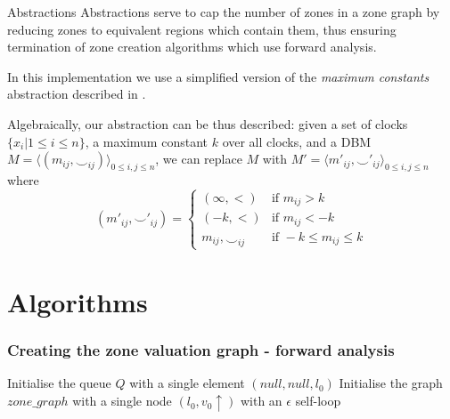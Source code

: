 \documentclass{beamer}
\begin{document}
\begin{frame}{Abstractions}
Abstractions serve to cap the number of zones in a
zone graph by reducing zones to equivalent regions which contain them,
thus ensuring termination of zone creation algorithms which use
forward analysis.

In this implementation we use a simplified version of the
\emph{maximum constants} abstraction described in
\cite{Behrmann03staticguard}.

Algebraically, our abstraction can be thus described: given a set of
clocks $\{x_i | 1 \leq i \leq n \}$, a maximum constant $k$ over all
clocks, and a DBM $M = \langle (m_{ij}, \smile _{ij})\rangle _{0 \leq
  i,j \leq n} $, we can replace $M$ with $M' = \langle m'_{ij}, \smile
'_{ij}\rangle _{0 \leq i,j \leq n} $ where
\begin{displaymath}
  (m'_{ij}, \smile'_{ij}) =
    \begin{cases}
      (\infty, <)  & \mbox{if } m_{ij} > k \\
      (-k, <)  & \mbox{if } m_{ij} < -k \\
      m_{ij}, \smile _{ij} & \mbox{if } -k \leq m_{ij} \leq k
    \end{cases}
\end{displaymath}

\end{frame}

\section{Algorithms}

\begin{frame}[fragile, shrink=20]
  \frametitle{Creating the zone valuation graph - forward analysis}

  \begin{algorithm2e}[H]
    Initialise the queue $Q$ with a single element $(null, null, l_0)$\;
    Initialise the graph $zone\_graph$ with a single node $(l_0, v_0 \uparrow)$
    with an $\epsilon$ self-loop\;
  \end{algorithm2e}
\end{frame}
\end{document}
